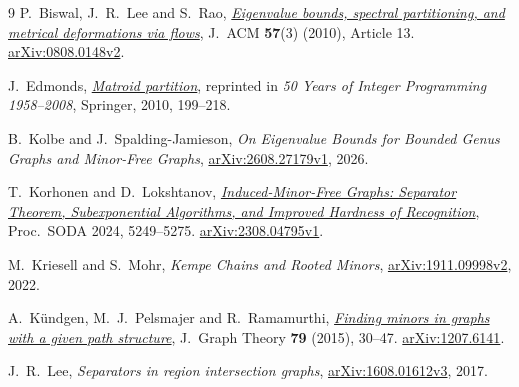 \documentclass[11pt]{amsart}
\begin{document}
\begin{thebibliography}{9}
P.~Biswal, J.~R.~Lee and S.~Rao,
\href{https://doi.org/10.1145/1706591.1706593}{\emph{Eigenvalue bounds,
spectral partitioning, and metrical deformations via flows}},
J.~ACM \textbf{57}(3) (2010), Article 13.
\href{https://arxiv.org/abs/0808.0148v2}{arXiv:0808.0148v2}.

J.~Edmonds,
\href{https://doi.org/10.1007/978-3-540-68279-0_7}{\emph{Matroid partition}},
reprinted in \emph{50 Years of Integer Programming 1958--2008},
Springer, 2010, 199--218.

B.~Kolbe and J.~Spalding-Jamieson,
\emph{On Eigenvalue Bounds for Bounded Genus Graphs and Minor-Free Graphs},
\href{https://arxiv.org/abs/2608.27179v1}{arXiv:2608.27179v1}, 2026.

T.~Korhonen and D.~Lokshtanov,
\href{https://doi.org/10.1137/1.9781611977912.188}{\emph{Induced-Minor-Free
Graphs: Separator Theorem, Subexponential Algorithms, and Improved
Hardness of Recognition}},
Proc.~SODA 2024, 5249--5275.
\href{https://arxiv.org/abs/2308.04795v1}{arXiv:2308.04795v1}.

M.~Kriesell and S.~Mohr, \emph{Kempe Chains and Rooted Minors},
\href{https://arxiv.org/abs/1911.09998v2}{arXiv:1911.09998v2}, 2022.

A.~K\"undgen, M.~J.~Pelsmajer and R.~Ramamurthi,
\href{https://doi.org/10.1002/jgt.21812}{\emph{Finding minors in graphs
with a given path structure}},
J.~Graph Theory \textbf{79} (2015), 30--47.
\href{https://arxiv.org/abs/1207.6141}{arXiv:1207.6141}.

J.~R.~Lee, \emph{Separators in region intersection graphs},
\href{https://arxiv.org/abs/1608.01612v3}{arXiv:1608.01612v3}, 2017.
\end{thebibliography}
\end{document}
